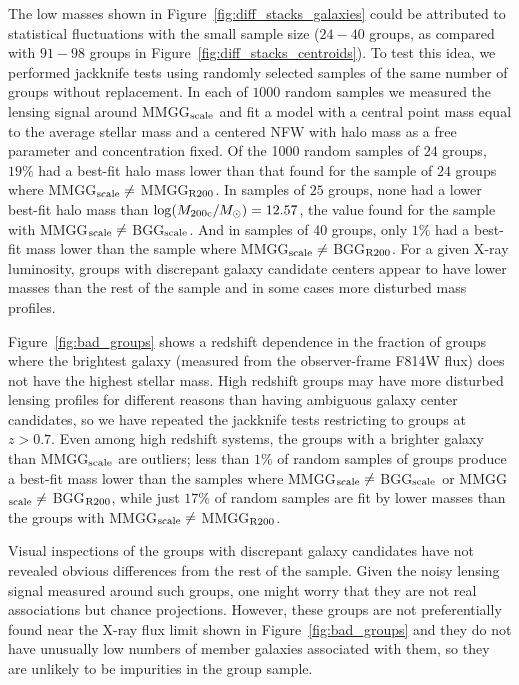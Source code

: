 \documentclass[12pt]{emulateapj}
\begin{document}
The low masses shown in
Figure~\ref{fig:diff_stacks_galaxies} could be attributed to
statistical fluctuations with the small sample size ($24-40$ groups,
as compared with $91-98$ groups in
Figure~\ref{fig:diff_stacks_centroids}). To test this idea, we performed
jackknife tests using randomly selected samples of the same number of groups without
replacement. In each of $1000$ random samples we measured the lensing
signal around MMGG$_{\rm scale}$ and fit a model with a central point
mass equal to the average stellar mass and a centered NFW with halo
mass as a free parameter and concentration fixed. Of the 1000 random samples of
$24$ groups, $19\%$ had a best-fit halo mass lower than that found for
the sample of $24$ groups where MMGG$_{\rm scale} \ne$ MMGG$_{\rm
  R200}$. In samples of $25$ groups, none had a lower best-fit halo
mass than $\log(M_{\rm 200c}/M_{\odot})=12.57$, the value found for
the sample with MMGG$_{\rm scale} \ne$ BGG$_{\rm scale}$. And in
samples of $40$ groups, only $1\%$ had a best-fit mass lower than the
sample where MMGG$_{\rm scale} \ne$ BGG$_{\rm R200}$. For a given
X-ray luminosity, groups with discrepant galaxy candidate centers
appear to have lower masses than the rest of the sample and
in some cases more
disturbed mass profiles. 

Figure~\ref{fig:bad_groups} shows a redshift dependence in the
fraction of groups where the brightest galaxy (measured from the
observer-frame F814W flux) does not have the highest stellar
mass. High redshift groups may have more disturbed lensing profiles
for different reasons than having ambiguous galaxy center candidates,
so we have repeated the jackknife tests restricting to groups at
$z>0.7$. Even among high redshift systems, the groups with a brighter
galaxy than MMGG$_{\rm scale}$ are outliers; less than $1\%$ of random
samples of groups produce a best-fit mass lower than the samples where
MMGG$_{\rm scale} \ne$ BGG$_{\rm scale}$ or MMGG$_{\rm scale} \ne$
BGG$_{\rm R200}$, while just $17\%$ of random samples are fit by lower
masses than the groups with MMGG$_{\rm scale} \ne$ MMGG$_{\rm R200}$.

Visual inspections of the groups with discrepant galaxy candidates
have not revealed obvious differences from the rest of the
sample. Given the noisy lensing signal measured around such groups, one might
worry that they are not real associations but chance
projections. However, these groups are not preferentially found near
the X-ray flux limit shown in Figure~\ref{fig:bad_groups} and they do
not have unusually low numbers of member galaxies associated with
them, so they are unlikely to be impurities in the group sample.
\end{document}
